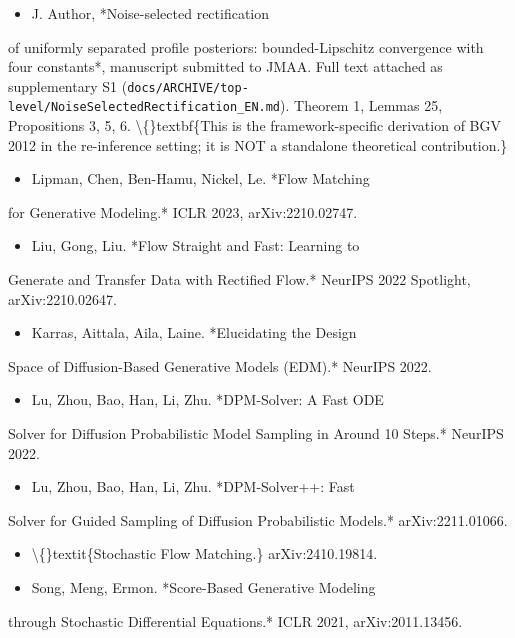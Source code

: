 \documentclass[preprint,3p,times,twocolumn]{elsarticle}
\begin{document}
\begin{itemize}
\item [Author submitted, 2026] J. Author, *Noise-selected rectification
\end{itemize}
of uniformly separated profile posteriors: bounded-Lipschitz convergence with four constants*, manuscript submitted to JMAA. Full text attached as supplementary S1 (\texttt{docs/ARCHIVE/top-level/NoiseSelectedRectification\_EN.md}). Theorem 1, Lemmas 25, Propositions 3, 5, 6. \textbackslash\{\}textbf\{This is the framework-specific derivation of BGV 2012 in the re-inference setting; it is NOT a standalone theoretical contribution.\}

\begin{itemize}
\item [Lipman 2023] Lipman, Chen, Ben-Hamu, Nickel, Le. *Flow Matching
\end{itemize}
for Generative Modeling.* ICLR 2023, arXiv:2210.02747.

\begin{itemize}
\item [Liu 2022] Liu, Gong, Liu. *Flow Straight and Fast: Learning to
\end{itemize}
Generate and Transfer Data with Rectified Flow.* NeurIPS 2022 Spotlight, arXiv:2210.02647.

\begin{itemize}
\item [Karras 2022] Karras, Aittala, Aila, Laine. *Elucidating the Design
\end{itemize}
Space of Diffusion-Based Generative Models (EDM).* NeurIPS 2022.

\begin{itemize}
\item [Lu 2022] Lu, Zhou, Bao, Han, Li, Zhu. *DPM-Solver: A Fast ODE
\end{itemize}
Solver for Diffusion Probabilistic Model Sampling in Around 10 Steps.* NeurIPS 2022.

\begin{itemize}
\item [Lu 2022b] Lu, Zhou, Bao, Han, Li, Zhu. *DPM-Solver++: Fast
\end{itemize}
Solver for Guided Sampling of Diffusion Probabilistic Models.* arXiv:2211.01066.

\begin{itemize}
\item [NVIDIA 2024] \textbackslash\{\}textit\{Stochastic Flow Matching.\} arXiv:2410.19814.
\item [Song 2021] Song, Meng, Ermon. *Score-Based Generative Modeling
\end{itemize}
through Stochastic Differential Equations.* ICLR 2021, arXiv:2011.13456.
\end{document}
